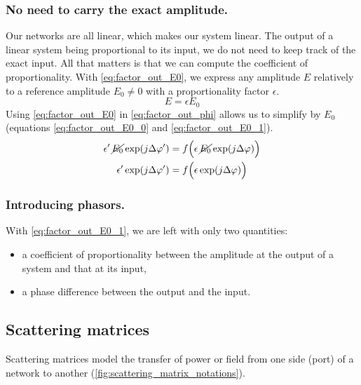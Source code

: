 \subsubsection{No need to carry the exact amplitude.}
Our networks are all linear, which makes our system linear.
The output of a linear system being proportional to its input, we do not need to keep track of the exact input.
All that matters is that we can compute the coefficient of proportionality.
With \cref{eq:factor_out_E0}, we express any amplitude $E$ relatively to a reference amplitude $E_0 \ne 0$ with a proportionality factor $\epsilon$.
\begin{equation}
    E = \epsilon E_0 \label{eq:factor_out_E0}
\end{equation}
Using \cref{eq:factor_out_E0} in \cref{eq:factor_out_phi} allows us to simplify by $E_0$ (equations \eqref{eq:factor_out_E0_0} and \eqref{eq:factor_out_E0_1}).
\begin{align}
    \epsilon' \,\cancel{E_0} \exp(j\Delta\varphi')
    &=
    f\Big(
        \epsilon \,\cancel{E_0} \exp(j\Delta\varphi)
    \Big)
    \label{eq:factor_out_E0_0}
    \\
    \epsilon' \exp(j\Delta\varphi')
    &=
    f\Big(
        \epsilon \exp(j\Delta\varphi)
    \Big)
    \label{eq:factor_out_E0_1}
\end{align}



\subsubsection{Introducing phasors.}
With \cref{eq:factor_out_E0_1}, we are left with only two quantities:
\begin{itemize}
    \item a coefficient of proportionality between the amplitude at the output of a system and that at its input,
    \item a phase difference between the output and the input.
\end{itemize}


\subsection{Scattering matrices}
Scattering matrices \cite{siegman1986lasers} model the transfer of power or field from one side (port) of a network to another (\cref{fig:scattering_matrix_notations}).

